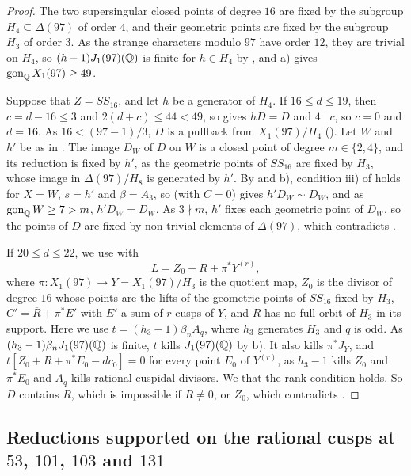 \begin{proof}
The two supersingular closed points of degree $16$ are fixed by the subgroup $H_4\subseteq\Delta(97)$ of order $4$, and their geometric points are fixed by the subgroup $H_3$ of order $3$. As the strange characters modulo $97$ have order $12$, they are trivial on $H_4$, so $(h-1)J_1(97)(\mathbb{Q})$ is finite for $h\in H_4$ by , and  a) gives $\operatorname{gon}_{\mathbb{Q}} X_1(97)\geq49$.

Suppose that $Z=SS_{16}$, and let $h$ be a generator of $H_4$. If $16\leq d\leq 19$, then $c=d-16\leq 3$ and $2(d+c)\leq 44<49$, so  gives $hD=D$ and $4\mid c$, so $c=0$ and $d=16$. As $16<(97-1)/3$, $D$ is a pullback from $X_1(97)/H_4$ (). Let $W$ and $h'$ be as in . The image $D_W$ of $D$ on $W$ is a closed point of degree $m\in\{2,4\}$, and its reduction is fixed by $h'$, as the geometric points of $SS_{16}$ are fixed by $H_3$, whose image in $\Delta(97)/H_8$ is generated by $h'$. By  and  b), condition iii) of  holds for $X=W$, $s=h'$ and $\beta=A_3$, so  (with $C=0$) gives $h'D_W\sim D_W$, and as $\operatorname{gon}_{\mathbb{Q}} W\geq 7>m$, $h'D_W=D_W$. As $3\nmid m$, $h'$ fixes each geometric point of $D_W$, so the points of $D$ are fixed by non-trivial elements of $\Delta(97)$, which contradicts .

If $20\leq d\leq 22$, we use  with
$$L=Z_0+R+\pi^*Y^{(r)},$$
where $\pi:X_1(97)\to Y=X_1(97)/H_3$ is the quotient map, $Z_0$ is the divisor of degree $16$ whose points are the lifts of the geometric points of $SS_{16}$ fixed by $H_3$, $C'=\overline R+\pi^*E'$ with $E'$ a sum of $r$ cusps of $Y$, and $R$ has no full orbit of $H_3$ in its support. Here we use $t=(h_3-1)\beta_nA_q$, where $h_3$ generates $H_3$ and $q$ is odd. As $(h_3-1)\beta_nJ_1(97)(\mathbb{Q})$ is finite, $t$ kills $J_1(97)(\mathbb{Q})$ by  b). It also kills $\pi^*J_Y$, and $t[Z_0+R+\pi^*E_0-dc_0]=0$ for every point $E_0$ of $Y^{(r)}$, as $h_3-1$ kills $Z_0$ and $\pi^*E_0$ and $A_q$ kills rational cuspidal divisors. We  that the rank condition holds. So $D$ contains $R$, which is impossible if $R\neq0$, or $Z_0$, which contradicts .
\end{proof}

\subsection{Reductions supported on the rational cusps at \texorpdfstring{$53$}{53}, \texorpdfstring{$101$}{101}, \texorpdfstring{$103$}{103} and \texorpdfstring{$131$}{131}}

